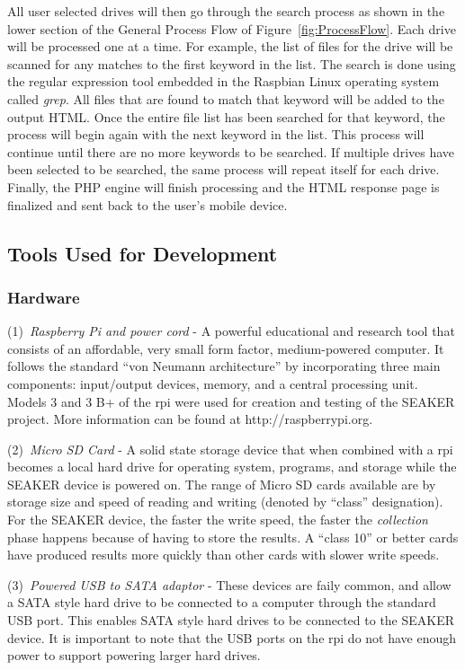\documentclass[12pt]{article}
\begin{document}
All user selected drives will then go through the search process as
shown in the lower section of the General Process Flow of
Figure~\ref{fig:ProcessFlow}. Each drive will be processed one at a
time. For example, the list of files for the drive will be scanned
for any matches to the first keyword in the list. The search is done
using the regular expression tool embedded in the Raspbian Linux
operating system called {\em grep}. All files that are found to match
that keyword will be added to the output HTML. Once the entire file
list has been searched for that keyword, the process will begin again
with the next keyword in the list. This process will continue until
there are no more keywords to be searched. If multiple drives have
been selected to be searched, the same process will repeat itself
for each drive. Finally, the PHP engine will finish processing and
the HTML response page is finalized and sent back to the user's
mobile device.


\subsection{Tools Used for Development}

\subsubsection{Hardware}

(1)~{\em Raspberry Pi and power cord} - A powerful educational and research
tool that consists of an affordable, very small form factor, medium-powered
computer.  It follows the standard ``von Neumann architecture'' by 
incorporating three main components: input/output devices, memory, and a 
central processing unit.  Models 3 and 3 B+ of the \gls{rpi} were used
for creation and testing of the SEAKER project. More information can be
found at http://raspberrypi.org.

(2)~{\em Micro SD Card} - A solid state storage device that when combined
with a \gls{rpi} becomes a local hard drive for operating system, programs,
and storage while the SEAKER device is powered on.  The range of Micro SD
cards available are by storage size and speed of reading and writing
(denoted by ``class'' designation).  For
the SEAKER device, the faster the write speed, the faster the
{\em collection} phase happens because of having to store the results.
A ``class 10'' or better cards have produced results more quickly than
other cards with slower write speeds.

(3)~{\em Powered USB to SATA adaptor} - These devices are faily common, and
allow a SATA style hard drive to be connected to a computer through the
standard USB port.  This enables SATA style hard drives to be connected
to the SEAKER device.  It is important to note that the USB ports on the
\gls{rpi} do not have enough power to support powering larger hard
drives.
\end{document}

